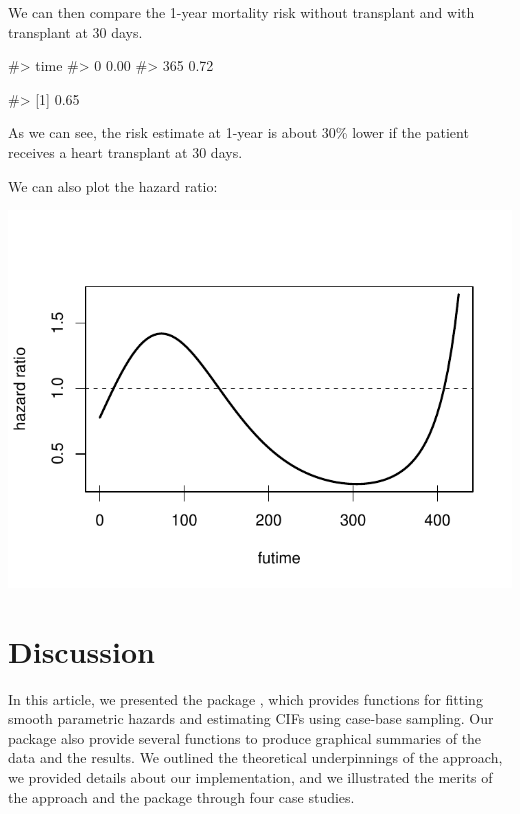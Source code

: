 \documentclass[
]{jss}
\begin{document}
We can then compare the 1-year mortality risk without transplant and
with transplant at 30 days.

\begin{CodeChunk}

\begin{CodeOutput}
#>  time     
#>     0 0.00
#>   365 0.72
\end{CodeOutput}

\begin{CodeOutput}
#> [1] 0.65
\end{CodeOutput}
\end{CodeChunk}

As we can see, the risk estimate at 1-year is about 30\% lower if the
patient receives a heart transplant at 30 days.

We can also plot the hazard ratio:

\begin{CodeChunk}


\begin{center}\includegraphics[width=\textwidth,keepaspectratio=true]{../figures/unnamed-chunk-12-1} \end{center}

\end{CodeChunk}

\hypertarget{discussion}{%
\section{Discussion}\label{discussion}}

In this article, we presented the  package ,
which provides functions for fitting smooth parametric hazards and
estimating CIFs using case-base sampling. Our package also provide
several functions to produce graphical summaries of the data and the
results. We outlined the theoretical underpinnings of the approach, we
provided details about our implementation, and we illustrated the merits
of the approach and the package through four case studies.
\end{document}
